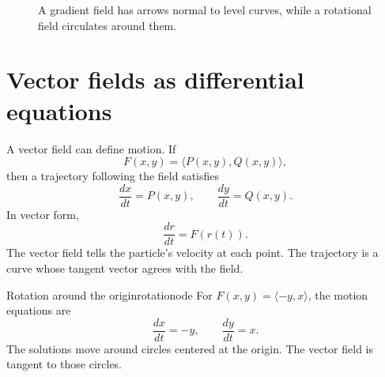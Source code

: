 \documentclass[11pt]{article}
\begin{document}
\begin{figure}[H]
\centering
{}
\caption{A gradient field has arrows normal to level curves, while a rotational field circulates around them.}
\end{figure}

\section{Vector fields as differential equations}

A vector field can define motion. If
\[
F(x,y)=\langle P(x,y),Q(x,y)\rangle,
\]
then a trajectory following the field satisfies
\[
\frac{dx}{dt}=P(x,y),\qquad \frac{dy}{dt}=Q(x,y).
\]
In vector form,
\[
\frac{dr}{dt}=F(r(t)).
\]
The vector field tells the particle's velocity at each point. The trajectory is a curve whose tangent vector agrees with the field.

\begin{examplebox}{Rotation around the origin}{rotationode}
For $F(x,y)=\langle -y,x\rangle$, the motion equations are
\[
\frac{dx}{dt}=-y,\qquad \frac{dy}{dt}=x.
\]
The solutions move around circles centered at the origin. The vector field is tangent to those circles.
\end{examplebox}
\end{document}
